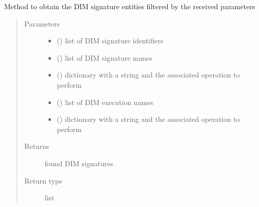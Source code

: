 \begin{fulllineitems}

\begin{fulllineitems}
\label{\detokenize{eboa.engine:eboa.engine.query.Query.get_dim_signatures}}
Method to obtain the DIM signature entities filtered by the received parameters
\begin{quote}\begin{description}
\item[{Parameters}] \leavevmode\begin{itemize}
\item {} 
 () \textendash{} list of DIM signature identifiers

\item {} 
 () \textendash{} list of DIM signature names

\item {} 
 () \textendash{} dictionary with a string and the associated operation to perform

\item {} 
 () \textendash{} list of DIM execution names

\item {} 
 () \textendash{} dictionary with a string and the associated operation to perform

\end{itemize}

\item[{Returns}] \leavevmode
found DIM signatures

\item[{Return type}] \leavevmode
list

\end{description}\end{quote}


\end{fulllineitems}
\end{fulllineitems}
